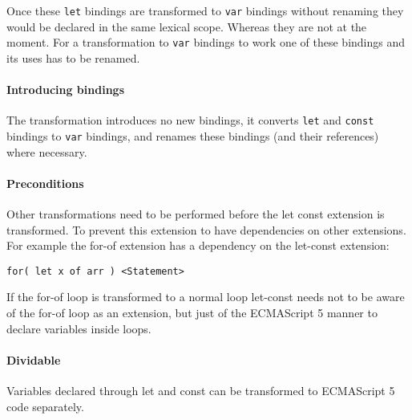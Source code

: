 Once these \lstinline$let$ bindings are transformed to \lstinline$var$ bindings without renaming they would be declared in the same lexical scope. Whereas they are not at the moment. For a transformation to \lstinline$var$ bindings to work one of these bindings and its uses has to be renamed.

\paragraph{Introducing bindings}
The transformation introduces no new bindings, it converts \lstinline$let$ and \lstinline$const$ bindings to \lstinline$var$ bindings, and renames these bindings (and their references) where necessary.

\paragraph{Preconditions}
Other transformations need to be performed before the let const extension is transformed. To prevent this extension to have dependencies on other extensions. For example the for-of extension has a dependency on the let-const extension:

\begin{lstlisting}
for( let x of arr ) <Statement>
\end{lstlisting}

If the for-of loop is transformed to a normal loop let-const needs not to be aware of the for-of loop as an extension, but just of the ECMAScript 5 manner to declare variables inside loops.

\paragraph{Dividable}
Variables declared through let and const can be transformed to ECMAScript 5 code separately.
